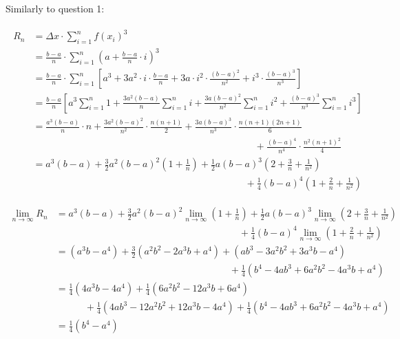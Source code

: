 \documentclass[12pt]{article}
\begin{document}
Similarly to question 1: \par
\begin{align*}
    \begin{split}
        R_n &=\Delta x\cdot\sum_{i=1}^{n}f\left(x_i\right)^3\\
        &=\frac{b-a}{n}\cdot\sum_{i=1}^{n}\left(a +\frac{b-a}{n}\cdot i \right)^3\\
        &=\frac{b-a}{n}\cdot\sum_{i=1}^{n} \left[a^3+ 3a^2\cdot i\cdot\frac{b-a}{n}+ 3a\cdot i^2\cdot\frac{\left(b-a\right)^2}{n^2} + i^3\cdot\frac{\left(b-a\right)^3}{n^3}\right]\\
        &=\frac{b-a}{n}\left[ a^3\sum_{i=1}^{n}1 
        + \frac{3a^2\left(b-a\right)}{n} \sum_{i=1}^{n}i
        + \frac{3a\left(b-a\right)^2}{n^2} \sum_{i=1}^{n}i^2
        + \frac{\left(b-a\right)^3}{n^3} \sum_{i=1}^{n}i^3 \right]\\
        &=\frac{a^3\left(b-a\right)}{n}\cdot n
        + \frac{3a^2\left(b-a\right)^2}{n^2} \cdot\frac{n\left(n+1\right)}{2}
        + \frac{3a\left(b-a\right)^3}{n^3} \cdot\frac{n\left(n+1\right)\left(2n+1\right)}{6}\\
        &\qquad\qquad\qquad\qquad\qquad\qquad\qquad\qquad\qquad\qquad
        \qquad\quad
        + \frac{\left(b-a\right)^4}{n^4} \cdot \frac{n^2\left(n+1 \right)^2}{4}\\
        &=a^3\left(b-a\right)
        + \frac{3}{2} a^2\left(b-a\right)^2 \left(1+\frac{1}{n}\right)
        + \frac{1}{2} a\left(b-a\right)^3 \left(2+ \frac{3}{n}+ \frac{1}{n^2} \right) \\
        &\qquad\qquad\qquad\qquad\qquad\qquad\qquad\qquad
        \qquad\qquad\qquad
        + \frac{1}{4} \left(b-a\right)^4 \left(1+ \frac{2}{n}+ \frac{1}{n^2} \right)
    \end{split}
\end{align*}

\begin{align*}
    \lim_{n\to\infty}R_n &=a^3\left(b-a\right)
    + \frac{3}{2} a^2\left(b-a\right)^2 \lim_{n\to\infty}\left(1+\frac{1}{n}\right)
    + \frac{1}{2} a\left(b-a\right)^3 \lim_{n\to\infty}\left(2+ \frac{3}{n}+ \frac{1}{n^2} \right)\\
    &\qquad\qquad\qquad\qquad\qquad\qquad\qquad\qquad
    \qquad\quad
    +\frac{1}{4} \left(b-a\right)^4 \lim_{n\to\infty} \left(1+ \frac{2}{n}+ \frac{1}{n^2} \right)\\
    &=\left(a^3b-a^4\right) 
    + \frac{3}{2} \left(a^2b^2-2a^3b+a^4\right)
    + \left(ab^3-3a^2b^2+3a^3b-a^4\right) \\
    &\qquad\qquad\qquad\qquad\qquad\qquad\qquad\qquad
    \qquad
    + \frac{1}{4} \left(b^4-4ab^3+6a^2b^2-4a^3b+a^4 \right) \\
    &= \frac{1}{4} \left(4a^3b-4a^4\right)
    + \frac{1}{4} \left(6a^2b^2-12a^3b+6a^4\right)\\
    &\qquad\quad
    + \frac{1}{4} \left(4ab^3-12a^2b^2+12a^3b-4a^4\right)
    + \frac{1}{4} \left(b^4-4ab^3+6a^2b^2-4a^3b+a^4 \right) \\
    &=\frac{1}{4} \left(b^4-a^4 \right)
\end{align*}
\end{document}
